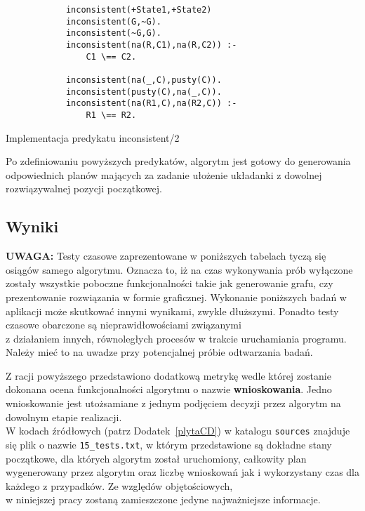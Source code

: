     \begin{listing}[H]
        \begin{verbatim}
            inconsistent(+State1,+State2)
            inconsistent(G,~G).
            inconsistent(~G,G).
            inconsistent(na(R,C1),na(R,C2)) :-
                C1 \== C2.
            
            inconsistent(na(_,C),pusty(C)).
            inconsistent(pusty(C),na(_,C)).
            inconsistent(na(R1,C),na(R2,C)) :-
                R1 \== R2.
        \end{verbatim}
    \caption{Implementacja predykatu inconsistent/2}
    \end{listing}

    Po zdefiniowaniu powyższych predykatów, algorytm jest gotowy do generowania odpowiednich planów mających za zadanie ułożenie 
    układanki z dowolnej rozwiązywalnej pozycji początkowej.
    \subsection{Wyniki}

    \textbf{UWAGA:} Testy czasowe zaprezentowane w poniższych tabelach tyczą się osiągów samego algorytmu. Oznacza to, iż na czas wykonywania prób
    wyłączone zostały wszystkie poboczne funkcjonalności takie jak generowanie grafu, czy prezentowanie rozwiązania w formie graficznej. 
    Wykonanie poniższych badań w aplikacji może skutkować innymi wynikami, zwykle dłuższymi. Ponadto testy czasowe obarczone są nieprawidłowościami 
    związanymi \\
    z działaniem innych, równoległych procesów w trakcie uruchamiania programu. Należy mieć to na uwadze przy potencjalnej 
    próbie odtwarzania badań.

    Z racji powyższego przedstawiono dodatkową metrykę wedle której zostanie dokonana ocena funkcjonalności algorytmu o nazwie \textbf{wnioskowania}.
    Jedno wnioskowanie jest utożsamiane z jednym podjęciem decyzji przez algorytm na dowolnym etapie realizacji. \\
    W kodach źródłowych (patrz Dodatek~\ref{plytaCD}) w katalogu \texttt{sources} znajduje się plik o nazwie \texttt{15\_tests.txt}, w którym 
    przedstawione są dokładne stany początkowe, dla których algorytm został uruchomiony, całkowity plan wygenerowany przez algorytm oraz 
    liczbę wnioskowań jak i wykorzystany czas dla każdego z przypadków. Ze względów objętościowych, \\
    w niniejszej pracy zostaną zamieszczone 
    jedyne najważniejsze informacje.

